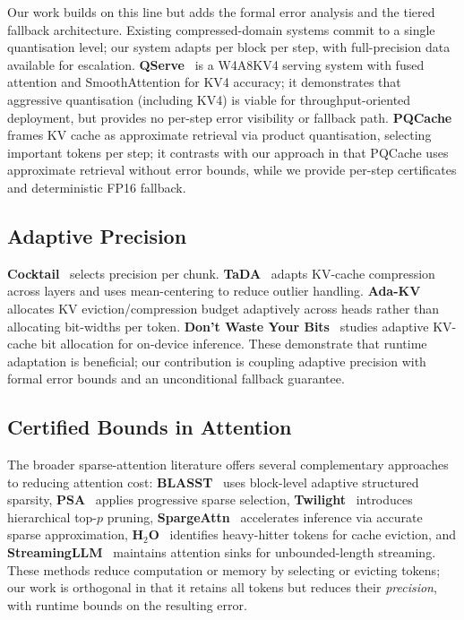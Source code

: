 \documentclass[10pt,twocolumn,a4paper]{article}
\theoremstyle{definition}
\theoremstyle{remark}
\begin{document}
Our work builds on this line but adds the formal error analysis and the tiered fallback architecture.  Existing compressed-domain systems commit to a single quantisation level; our system adapts per block per step, with full-precision data available for escalation.  \textbf{QServe}~\cite{qserve} is a W4A8KV4 serving system with fused attention and SmoothAttention for KV4 accuracy; it demonstrates that aggressive quantisation (including KV4) is viable for throughput-oriented deployment, but provides no per-step error visibility or fallback path.  \textbf{PQCache}~\cite{pqcache} frames KV cache as approximate retrieval via product quantisation, selecting important tokens per step; it contrasts with our approach in that PQCache uses approximate retrieval without error bounds, while we provide per-step certificates and deterministic FP16 fallback.

\subsection{Adaptive Precision}

\textbf{Cocktail}~\cite{cocktail} selects precision per chunk.  \textbf{TaDA}~\cite{tada} adapts KV-cache compression across layers and uses mean-centering to reduce outlier handling.  \textbf{Ada-KV}~\cite{adakv} allocates KV eviction/compression budget adaptively across heads rather than allocating bit-widths per token.  \textbf{Don't Waste Your Bits}~\cite{dontwastebits} studies adaptive KV-cache bit allocation for on-device inference.  These demonstrate that runtime adaptation is beneficial; our contribution is coupling adaptive precision with formal error bounds and an unconditional fallback guarantee.

\subsection{Certified Bounds in Attention}

The broader sparse-attention literature offers several complementary approaches to reducing attention cost: \textbf{BLASST}~\cite{blasst} uses block-level adaptive structured sparsity, \textbf{PSA}~\cite{psa} applies progressive sparse selection, \textbf{Twilight}~\cite{twilight} introduces hierarchical top-$p$ pruning, \textbf{SpargeAttn}~\cite{spargeattn} accelerates inference via accurate sparse approximation, \textbf{H$_2$O}~\cite{h2o} identifies heavy-hitter tokens for cache eviction, and \textbf{StreamingLLM}~\cite{streamingattn} maintains attention sinks for unbounded-length streaming.  These methods reduce computation or memory by selecting or evicting tokens; our work is orthogonal in that it retains all tokens but reduces their \emph{precision}, with runtime bounds on the resulting error.
\end{document}
